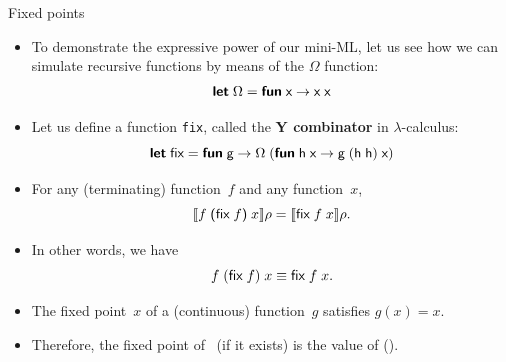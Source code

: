 %
\begin{frame}[fragile]{Fixed points}

  \begin{itemize}

    \item To demonstrate the expressive power of our mini-ML, let us
      see how we can simulate recursive functions by means of the
      $\Omega$ function:
   {\setlength{\abovedisplayskip}{0pt}
    \setlength{\belowdisplayskip}{2pt}
    \begin{equation*}
      \textsf{\textbf{let}} \; \Omega = \textsf{\textbf{fun}}\; \textsf{x} \rightarrow \textsf{x} \; \textsf{x}
   \end{equation*}}

    \item Let us define a function \texttt{\small fix}, called the
      \textbf{Y combinator} in \(\lambda\)-calculus:
   {\setlength{\abovedisplayskip}{0pt}
    \setlength{\belowdisplayskip}{2pt}
    \begin{equation*}
      \textsf{\textbf{let}} \; \textsf{fix} = \textsf{\textbf{fun}} \; \textsf{g} \rightarrow \Omega \;
      (\textsf{\textbf{fun}}\; \textsf{h} \; \textsf{x} \rightarrow \textsf{g} \;
      (\textsf{h} \; \textsf{h}) \; \textsf{x})
    \end{equation*}}

      \item For any (terminating) function~\(f\) and
        any function~\(x\),
        \begin{equation*}
          \llbracket{f \; \textsf{(}\textsf{fix} \; f\textsf{)}{} \; x}\rrbracket{\rho} =
          \llbracket{\textsf{fix} \; f \; x}\rrbracket{\rho}.
        \end{equation*}

      \item In other words, we have
        \begin{equation*}
          f \; (\textsf{fix} \; f) \; x \equiv \textsf{fix} \; f \; x.
        \end{equation*}

      \item The fixed point~\(x\) of a (continuous) function~\(g\)
        satisfies \(g(x) = x\).

      \item Therefore, the fixed point of~ (if it exists)
        is the value of ().

  \end{itemize}

\end{frame}

